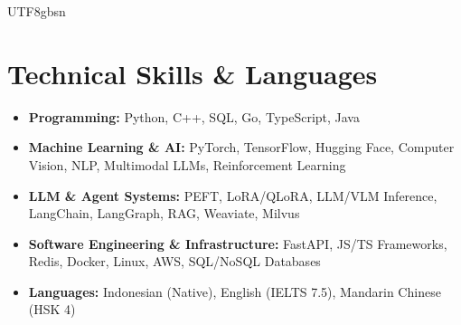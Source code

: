 \documentclass[letterpaper,11pt]{article}
\begin{document}
\begin{CJK*}{UTF8}{gbsn}
\section{Technical Skills \& Languages}
\begin{itemize}[leftmargin=0.1in, label={}, itemsep=1pt, parsep=0pt]
\small
  \item \textbf{Programming:} Python, C++, SQL, Go, TypeScript, Java
  \item \textbf{Machine Learning \& AI:} PyTorch, TensorFlow, Hugging Face, Computer Vision, NLP, Multimodal LLMs, Reinforcement Learning
  \item \textbf{LLM \& Agent Systems:} PEFT, LoRA/QLoRA, LLM/VLM Inference, LangChain, LangGraph, RAG, Weaviate, Milvus
  \item \textbf{Software Engineering \& Infrastructure:} FastAPI, JS/TS Frameworks, Redis, Docker, Linux, AWS, SQL/NoSQL Databases
  \item \textbf{Languages:} Indonesian (Native), English (IELTS 7.5), Mandarin Chinese (HSK 4)
\end{itemize}


\end{CJK*}
\end{document}
